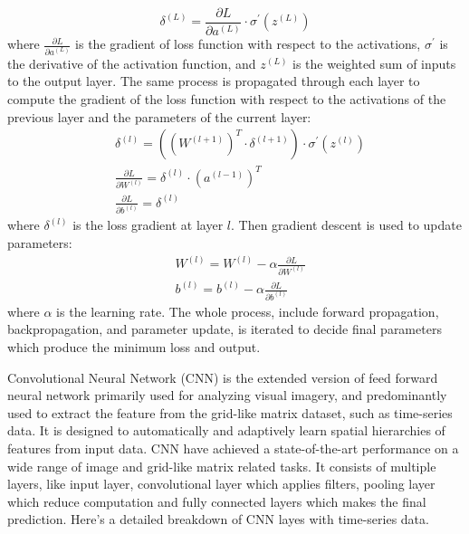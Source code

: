 \documentclass[12pt,a4paper,english
]{tunithesis}
\begin{document}
\begin{equation}
    \delta^{(L)}=\frac{\partial L}{\partial a^{(L)}} \cdot \sigma^{\prime}\left(z^{(L)}\right)
\end{equation}
where $\frac{\partial L}{\partial a^{(L)}}$ is the gradient of loss function with respect to the activations, $\sigma^{\prime}$ is the derivative of the activation function, and $z^{(L)}$ is the weighted sum of inputs to the output layer. The same process is propagated through each layer to compute the gradient of the loss function with respect to the activations of the previous layer and the parameters of the current layer:
\begin{equation}
    \begin{aligned}
& \delta^{(l)}=\left(\left(W^{(l+1)}\right)^T \cdot \delta^{(l+1)}\right) \cdot \sigma^{\prime}\left(z^{(l)}\right) \\
& \frac{\partial L}{\partial W^{(l)}}=\delta^{(l)} \cdot\left(a^{(l-1)}\right)^T \\
& \frac{\partial L}{\partial b^{(l)}}=\delta^{(l)}
\end{aligned}
\end{equation}
where $\delta^{(l)}$ is the loss gradient at layer $l$. Then gradient descent is used to update parameters:
\begin{equation}
    \begin{aligned}
& W^{(l)}=W^{(l)}-\alpha \frac{\partial L}{\partial W^{(l)}} \\
& b^{(l)}=b^{(l)}-\alpha \frac{\partial L}{\partial b^{(l)}}
\end{aligned}
\end{equation}
where $\alpha$ is the learning rate. The whole process, include forward propagation, backpropagation, and parameter update, is iterated to decide final parameters which produce the minimum loss and output.

Convolutional Neural Network (CNN) is the extended version of feed forward neural network primarily used for analyzing visual imagery, and predominantly used to extract the feature from the grid-like matrix dataset, such as time-series data. It is designed to automatically and adaptively learn spatial hierarchies of features from input data. CNN have achieved a state-of-the-art performance on a wide range of image and grid-like matrix related tasks. It consists of multiple layers, like input layer, convolutional layer which applies filters, pooling layer which reduce computation and fully connected layers which makes the final prediction. Here's a detailed breakdown of CNN layes with time-series data.
\end{document}
